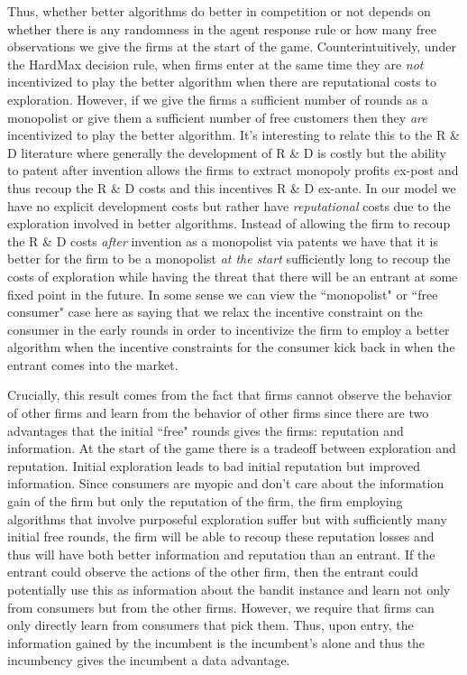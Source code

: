 \documentclass[11pt,letterpaper]{article}
\begin{document}
Thus, whether better algorithms do better in competition or not depends on whether there is any randomness in the agent response rule or how many free observations we give the firms at the start of the game. Counterintuitively, under the HardMax decision rule, when firms enter at the same time they are \textit{not} incentivized to play the better algorithm when there are reputational costs to exploration. However, if we give the firms a sufficient number of rounds as a monopolist or give them a sufficient number of free customers then they \textit{are} incentivized to play the better algorithm. It's interesting to relate this to the R \& D literature where generally the development of R \& D is costly but the ability to patent after invention allows the firms to extract monopoly profits ex-post and thus recoup the R \& D costs and this incentives R \& D ex-ante. In our model we have no explicit development costs but rather have \textit{reputational} costs due to the exploration involved in better algorithms. Instead of allowing the firm to recoup the R \& D costs \textit{after} invention as a monopolist via patents we have that it is better for the firm to be a monopolist \textit{at the start} sufficiently long to recoup the costs of exploration while having the threat that there will be an entrant at some fixed point in the future. In some sense we can view the ``monopolist" or ``free consumer" case here as saying that we relax the incentive constraint on the consumer in the early rounds in order to incentivize the firm to employ a better algorithm when the incentive constraints for the consumer kick back in when the entrant comes into the market.

Crucially, this result comes from the fact that firms cannot observe the behavior of other firms and learn from the behavior of other firms since there are two advantages that the initial ``free" rounds gives the firms: reputation and information. At the start of the game there is a tradeoff between exploration and reputation. Initial exploration leads to bad initial reputation but improved information. Since consumers are myopic and don't care about the information gain of the firm but only the reputation of the firm, the firm employing algorithms that involve purposeful exploration suffer but with sufficiently many initial free rounds, the firm will be able to recoup these reputation losses and thus will have both better information and reputation than an entrant. If the entrant could observe the actions of the other firm, then the entrant could potentially use this as information about the bandit instance and learn not only from consumers but from the other firms. However, we require that firms can only directly learn from consumers that pick them. Thus, upon entry, the information gained by the incumbent is the incumbent's alone and thus the incumbency gives the incumbent a data advantage.
\end{document}
